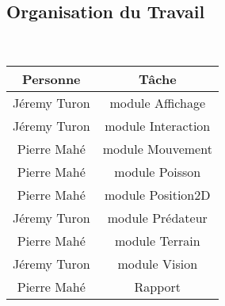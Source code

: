 \documentclass{article}
\begin{document}
\subsection{Organisation du Travail}
~~\vspace{0mm}
\begin{center}
\renewcommand{\arraystretch}{1.4}
\setlength{\tabcolsep}{10mm}
   \begin{tabular} {| c | c  | }
     \hline
     
     \textbf{Personne} & \textbf{Tâche} \\ \hline
     Jéremy Turon & module Affichage    \\ \hline
     Jéremy Turon & module Interaction\\ \hline
     Pierre Mahé & module Mouvement\\ \hline
     Pierre Mahé & module Poisson\\ \hline
     Pierre Mahé & module Position2D\\ \hline
     Jéremy Turon & module Prédateur\\ \hline
     Pierre Mahé & module Terrain\\ \hline
     Jéremy Turon & module Vision\\ \hline
     Pierre Mahé & Rapport\\
     \hline
   \end{tabular}
 \end{center}

 
\end{document}
